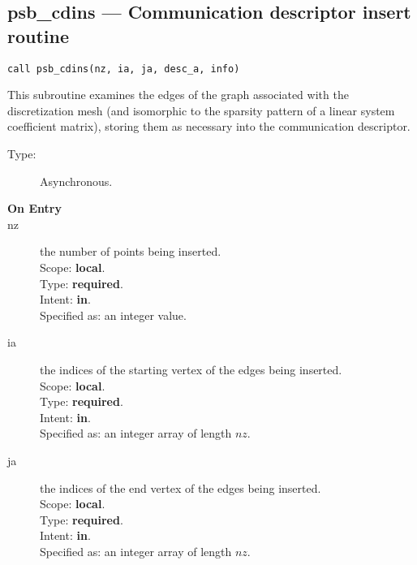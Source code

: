 %
%
\clearpage\subsection*{psb\_cdins --- Communication descriptor insert routine}

\begin{verbatim}
call psb_cdins(nz, ia, ja, desc_a, info)
\end{verbatim}

This subroutine examines the edges of the graph associated with the
discretization mesh (and isomorphic to the sparsity pattern of a
linear system coefficient matrix), storing them as necessary into the
communication descriptor.

\begin{description}
\item[Type:] Asynchronous.
\item[\bf On Entry]
\item[nz] the number of points being inserted.\\
Scope: {\bf local}.\\
Type: {\bf required}.\\
Intent: {\bf in}.\\
Specified as: an integer value.
\item[ia] the indices of the starting vertex of the edges  being inserted.\\
Scope: {\bf local}.\\
Type: {\bf required}.\\
Intent: {\bf in}.\\
Specified as: an integer array of length $nz$.
\item[ja]  the indices of the end vertex of the edges  being inserted.\\
Scope: {\bf local}.\\
Type: {\bf required}.\\
Intent: {\bf in}.\\
Specified as: an integer array of length $nz$.
\end{description}

